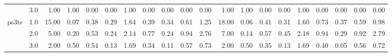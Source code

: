 \begin{tabular}{llrrrrrrrrrrrrrrrrrr}
      & 3.0 &               1.00 &                     1.00 &                                 0.00 &                             0.00 &                           1.00 &                                               0.00 &                                            0.00 &                                            0.00 &                                        0.00 &               1.00 &                     1.00 &                                 0.00 &                             0.00 &                           1.00 &                                               0.00 &                                            0.00 &                                            0.00 &                                        0.00 \\
ps3ts & 1.0 &              15.00 &                     0.07 &                                 0.38 &                             0.29 &                           1.64 &                                               0.39 &                                            0.34 &                                            0.61 &                                        1.25 &              18.00 &                     0.06 &                                 0.41 &                             0.31 &                           1.60 &                                               0.73 &                                            0.37 &                                            0.59 &                                        0.98 \\
      & 2.0 &               5.00 &                     0.20 &                                 0.53 &                             0.24 &                           2.14 &                                               0.77 &                                            0.24 &                                            0.94 &                                        2.76 &               7.00 &                     0.14 &                                 0.57 &                             0.45 &                           2.18 &                                               0.94 &                                            0.29 &                                            0.92 &                                        2.79 \\
      & 3.0 &               2.00 &                     0.50 &                                 0.54 &                             0.13 &                           1.69 &                                               0.34 &                                            0.11 &                                            0.57 &                                        0.73 &               2.00 &                     0.50 &                                 0.35 &                             0.13 &                           1.69 &                                               0.40 &                                            0.05 &                                            0.56 &                                        0.72 \\

\end{tabular}
